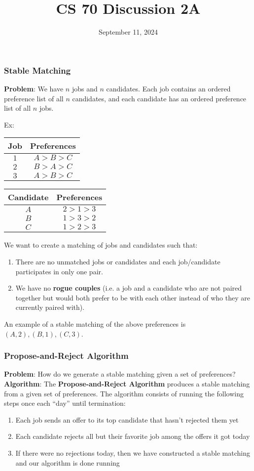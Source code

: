 \documentclass{beamer}
\title{CS 70 Discussion 2A}
\date{September 11, 2024}
\begin{document}
\frame{\titlepage}

\begin{frame}
    \frametitle{Stable Matching}
    {\bf Problem}: We have $n$ jobs and $n$ candidates. Each job contains an ordered preference list of all $n$ candidates, and each candidate has an ordered preference list of all $n$ jobs.
    \begin{center}
        Ex: 
        \begin{tabular}{c|c}
            Job & Preferences \\
            \hline
            $1$ & $A>B>C$\\
            $2$ & $B>A>C$\\
            $3$ & $A>B>C$
        \end{tabular}
        \hspace{10pt}
        \begin{tabular}{c|c}
            Candidate & Preferences \\
            \hline
            $A$ & $2>1>3$\\
            $B$ & $1>3>2$\\
            $C$ & $1>2>3$
        \end{tabular}
    \end{center}
    We want to create a matching of jobs and candidates such that:
    \begin{enumerate}
        \item There are no unmatched jobs or candidates and each job/candidate participates in only one pair.
        \item We have no {\bf rogue couples} (i.e. a job and a candidate who are not paired together but would both prefer to be with each other instead of who they are currently paired with).
    \end{enumerate}
    An example of a stable matching of the above preferences is $(A,2),(B,1),(C,3)$.
\end{frame}

\begin{frame}
    \frametitle{Propose-and-Reject Algorithm}
    {\bf Problem}: How do we generate a stable matching given a set of preferences?\\
    {\bf Algorithm}: The {\bf Propose-and-Reject Algorithm} produces a stable matching from a given set of preferences. The algorithm consists of running the following steps once each ``day'' until termination:
    \begin{enumerate}[1.]
        \item Each job sends an offer to its top candidate that hasn't rejected them yet
        \item Each candidate rejects all but their favorite job among the offers it got today
        \item If there were no rejections today, then we have constructed a stable matching and our algorithm is done running
    \end{enumerate}
\end{frame}
\end{document}
